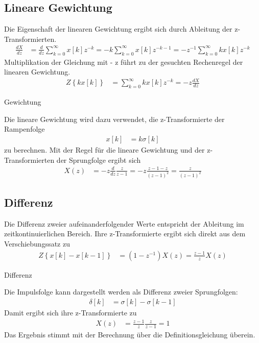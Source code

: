 \subsection{Lineare Gewichtung}\label{sec:lineare-gewichtung}

Die Eigenschaft der linearen Gewichtung ergibt sich durch Ableitung der z-Transformierten.
\begin{align}
\frac{dX}{dz} &= \frac{d}{dz}\sum\limits_{k = 0}^{\infty}{x[ k]  z^{- k}} = - k  \sum\limits_{k = 0}^{\infty}{x[ k]  z^{- k - 1}} = - z^{- 1}  \sum\limits_{k = 0}^{\infty}{k  x[ k]  z^{- k}} \label{eq:5.54}
\end{align}
Multiplikation der Gleichung mit - z führt zu der gesuchten Rechenregel der linearen Gewichtung.
\begin{align}
Z\left\{ k  x[ k] \right\} &= \sum\limits_{k = 0}^{\infty}{k  x[ k]  z^{- k}} = - z  \frac{dX}{dz} \label{eq:5.55}
\end{align}
\begin{example}{Gewichtung}
\label{example:beispiel-gewichtung}

Die lineare Gewichtung wird dazu verwendet, die z-Transformierte der Rampenfolge
\begin{align*}
x[ k] &= k  \sigma[ k] 
\end{align*}
zu berechnen. Mit der Regel für die lineare Gewichtung und der z-Transformierten der Sprungfolge ergibt sich
\begin{align*}
X(z) &= - z  \frac{d}{dz}\frac{z}{z - 1} = - z  \frac{z - 1 - z}{(z - 1)^{2}} = \frac{z}{(z - 1)^{2}} 
\end{align*}
\end{example}

\subsection{Differenz}\label{sec:differenz}

Die Differenz zweier aufeinanderfolgender Werte entspricht der Ableitung im zeitkontinuierlichen Bereich. Ihre z-Transformierte ergibt sich direkt aus dem Verschiebungssatz zu
\begin{align}
Z\left\{ x[ k] - x[ k - 1] \right\} &= \left( 1 - z^{- 1} \right)  X(z) = \frac{z - 1}{z}  X(z) \label{eq:5.58}
\end{align}
\begin{example}{Differenz}
\label{example:beispiel-differenz}

Die Impulsfolge kann dargestellt werden als Differenz zweier Sprungfolgen:
\begin{align*}
\delta[ k] &= \sigma[ k] - \sigma[ k - 1] 
\end{align*}
Damit ergibt sich ihre z-Transformierte zu
\begin{align*}
X(z) &= \frac{z - 1}{z}  \frac{z}{z - 1} = 1 
\end{align*}
Das Ergebnis stimmt mit der Berechnung über die Definitionsgleichung überein.

\end{example}

